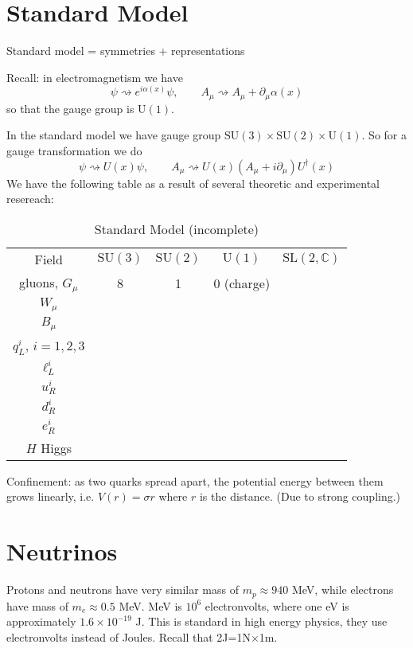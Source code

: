 \section{Standard Model}
\label{section-standard-model}

\begin{slogan}
Standard model = symmetries + representations
\end{slogan}

Recall: in electromagnetism we have
$$
\psi\rightsquigarrow e^{i\alpha(x)}\psi,\qquad 
A_\mu\rightsquigarrow A_\mu+\partial_\mu\alpha(x)
$$
so that the gauge group is $\text{U}(1)$.

In the standard model we have gauge group
$\text{SU}(3)\times\text{SU}(2)\times\text{U}(1)$. So for a gauge transformation
we do
$$
\psi\rightsquigarrow U(x)\psi,\qquad 
A_\mu\rightsquigarrow U(x)(A_\mu+i\partial_\mu)U^\dag(x)
$$
We have the following table as a result of several theoretic and experimental
resereach:
\begin{table}[H]
\centering
\caption{Standard Model (incomplete)}
\label{tab:standard-model}
\begin{tabular}{c c c c c}
Field &	$\text{SU}(3)$ & $\text{SU}(2)$ & $\text{U}(1)$ &
$\text{SL}(2,\mathbb{C})$ \\
gluons, $G_\mu$ & 8 & 1 & 0 (charge) & \\
$W_\mu$ & & & & &\\
$B_\mu$ &&&&\\
\hline
$q^i_L$, $i=1,2,3$ &&&&\\
$\ell^i_L$ &&&&\\
$u^i_R$ &&&&\\
$d^i_R$ &&&&\\
$e^i_R$ &&&&\\
\hline
$H$ Higgs &&&&
\end{tabular}
\end{table}

Confinement: as two quarks spread apart, the potential energy between them grows
linearly, i.e. $V(r)=\sigma r$ where $r$ is the distance. (Due to strong
coupling.)

\section{Neutrinos}
\label{section-neutrinos}


Protons and neutrons have very similar mass of $m_p\approx940$ MeV, while
electrons have mass of $m_e \approx 0.5$ MeV. MeV is $10^{6}$ electronvolts,
where one eV is approximately $1.6\times 10^{-19}$ J. This is standard in high
energy physics, they use electronvolts instead of Joules. Recall that
2J=1N$\times$1m.

